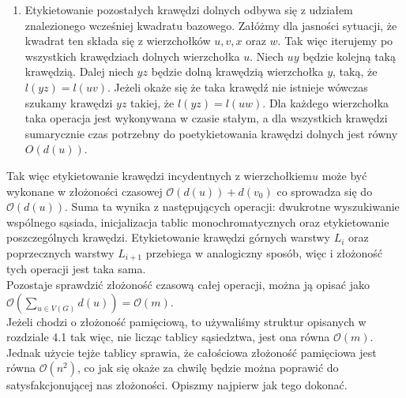 \documentclass[12pt,a4paper,titlepage]{article}
\begin{document}
\begin{enumerate}
\begin{enumerate}[a)]
\end{enumerate} 
\item
Etykietowanie pozostałych krawędzi dolnych odbywa się z udziałem znalezionego wcześniej kwadratu bazowego. Załóżmy dla jasności sytuacji, że kwadrat ten składa się z wierzchołków $u,v,x$ oraz $w$. Tak więc iterujemy po wszystkich krawędziach dolnych wierzchołka $u$. Niech $uy$ będzie kolejną taką krawędzią. Dalej niech $yz$ będzie dolną krawędzią wierzchołka $y$, taką, że $l(yz)=l(uv)$. Jeżeli okaże się że taka krawędź nie istnieje wówczas szukamy krawędzi $yz$ takiej, że $l(yz)=l(uw)$. Dla każdego wierzchołka taka operacja jest wykonywana w czasie stałym, a dla wszystkich krawędzi sumarycznie czas potrzebny do poetykietowania krawędzi dolnych jest równy $O(d(u))$. \\
\end{enumerate}
Tak więc etykietowanie krawędzi incydentnych z wierzchołkiem$u$ może być wykonane w złożoności czasowej $\mathcal{O}(d(u)) + d(v_0)$ co sprowadza się do $\mathcal{O}(d(u)) $. Suma ta wynika z następujących operacji: dwukrotne wyszukiwanie wspólnego sąsiada, inicjalizacja tablic monochromatycznych oraz etykietowanie poszczególnych krawędzi.
Etykietowanie krawędzi górnych warstwy $L_i$ oraz poprzecznych warstwy $L_{i+1}$ przebiega w analogiczny sposób, więc i złożoność tych operacji jest taka sama.\\
Pozostaje sprawdzić złożoność czasową całej operacji, można ją opisać jako \\
$\mathcal{O}(\sum _{u \in V(G)} d(u)) = \mathcal{O}(m)$.\\
Jeżeli chodzi o złożoność pamięciową, to używaliśmy struktur opisanych w rozdziale 4.1 tak więc, nie licząc tablicy sąsiedztwa, jest ona równa $\mathcal{O}(m)$. Jednak użycie tejże tablicy sprawia, że całościowa złożoność pamięciowa jest równa $\mathcal{O}(n^2)$, co jak się okaże za chwilę będzie można poprawić do satysfakcjonującej nas złożoności. Opiszmy najpierw jak tego dokonać.\\
\end{document}
